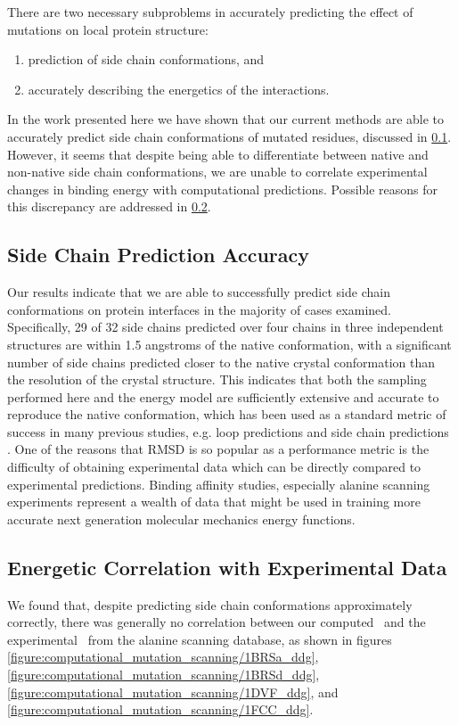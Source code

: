 There are two necessary subproblems in accurately predicting the effect of mutations on local protein structure:
\begin{enumerate}
\item prediction of side chain conformations, and
\item accurately describing the energetics of the interactions.
\end{enumerate}
In the work presented here we have shown that our current methods are able to accurately predict side chain conformations of mutated residues, discussed in \ref{subsection:side_chain_prediction_accuracy}.
However, it seems that despite being able to differentiate between native and non-native side chain conformations, we are unable to correlate experimental changes in binding energy with computational predictions.
Possible reasons for this discrepancy are addressed in \ref{subsection:energetic_correlation_with_experimental_data}.

\subsection{Side Chain Prediction Accuracy}
\label{subsection:side_chain_prediction_accuracy}
Our results indicate that we are able to successfully predict side chain conformations on protein interfaces in the majority of cases examined.
Specifically, 29 of 32 side chains predicted over four chains in three independent structures are within 1.5 angstroms of the native conformation, with a significant number of side chains predicted closer to the native crystal conformation than the resolution of the crystal structure.
This indicates that both the sampling performed here and the energy model are sufficiently extensive and accurate to reproduce the native conformation, which has been used as a standard metric of success in many previous studies, e.g. loop predictions \cite{jacobson2004hierarchical,rapp1999prediction,zhu2006long,sellers2008toward} and side chain predictions \cite{jacobson2002force,jacobson2002role,zhu2007improved}.
One of the reasons that RMSD is so popular as a performance metric is the difficulty of obtaining experimental data which can be directly compared to experimental predictions.
Binding affinity studies, especially alanine scanning experiments represent a wealth of data that might be used in training more accurate next generation molecular mechanics energy functions.


\subsection{Energetic Correlation with Experimental Data}
\label{subsection:energetic_correlation_with_experimental_data}
We found that, despite predicting side chain conformations approximately correctly, there was generally no correlation between our computed \ddg\ and the experimental \ddg\ from the alanine scanning database, as shown in figures \ref{figure:computational_mutation_scanning/1BRSa_ddg}, \ref{figure:computational_mutation_scanning/1BRSd_ddg}, \ref{figure:computational_mutation_scanning/1DVF_ddg}, and \ref{figure:computational_mutation_scanning/1FCC_ddg}.


